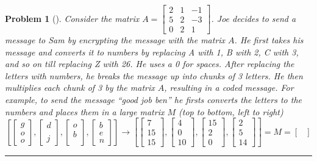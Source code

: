 \documentclass[letterpaper,oneside]{book}%
\theoremstyle{plain}
\theoremstyle{box}
\theoremstyle{problem}
\newtheorem{problemnum}{Problem}[chapter]
\newenvironment{problem}[1][]{\begin{problemnum}[#1]}{\end{problemnum}\nopagebreak\hrule\bigskip}
\begin{document}
\begin{problem}
Consider the matrix 
$A =
\begin{bmatrix}
 2&1&-1\\
 5&2&-3\\
 0&2&1
\end{bmatrix}
$.  
Joe decides to send a message to Sam by encrypting the message with the matrix $A$. He first takes his message and converts it to numbers by replacing A with 1, B with 2, C with 3, and so on till replacing Z with 26.  He uses a 0 for spaces.  After replacing the letters with numbers, he breaks the message up into chunks of 3 letters.  He then multiplies each chunk of 3 by the matrix $A$, resulting in a coded message. For example, to send the message ``good job ben'' he firsts converts the letters to the numbers and places them in a large matrix $M$ (top to bottom, left to right) 
$$
\left[
\begin{bmatrix}g\\o\\o\end{bmatrix}, \begin{bmatrix}d\\ \ \\ j\end{bmatrix},\begin{bmatrix}o\\b\\\  \end{bmatrix},\begin{bmatrix}b\\e\\n\end{bmatrix}\right] 
\rightarrow
\left[\begin{bmatrix}7\\15\\15\end{bmatrix}, \begin{bmatrix}4\\0\\10\end{bmatrix},\begin{bmatrix}15\\2\\0\end{bmatrix},\begin{bmatrix}2\\5\\14\end{bmatrix}\right] 
= M=
\begin{bmatrix}

\end{bmatrix}$$
\end{problem}
\end{document}
